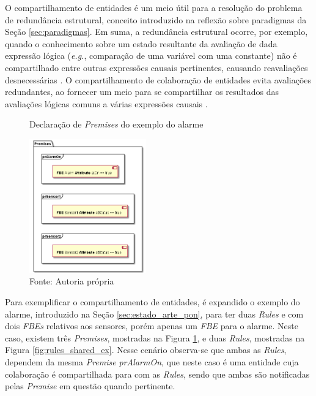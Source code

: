 O compartilhamento de entidades é um meio útil para a resolução do
problema de redundância estrutural, conceito introduzido na reflexão sobre
paradigmas da Seção \ref{sec:paradigmas}. Em suma, a redundância estrutural
ocorre, por exemplo, quando o conhecimento sobre um estado resultante da
avaliação de dada expressão lógica (\textit{e.g.}, comparação de uma variável com uma
constante) não é compartilhado entre outras expressões causais pertinentes,
causando reavaliações desnecessárias \cite{msc_Banaszewski_2009}. O
compartilhamento de colaboração de entidades evita avaliações redundantes, ao fornecer um meio
para se compartilhar os resultados das avaliações lógicas comuns a várias
expressões causais \cite{msc_Banaszewski_2009}.

\begin{figure}[!htb]
  \centering
  \caption{Declaração de \textit{Premises} do exemplo do alarme}
  \includegraphics[width=0.45\textwidth]{../out/diagrams/shared_premises/premises.png}
  \smallskip
  \caption*{Fonte: Autoria própria}
  \label{fig:premises_shared_ex}
\end{figure}

Para exemplificar o compartilhamento de entidades, é expandido o exemplo do
alarme, introduzido na Seção \ref{sec:estado_arte_pon}, para ter duas
\textit{Rules} e com dois \textit{FBEs} relativos aos sensores, porém apenas um
\textit{FBE} para o alarme. Neste caso, existem três \textit{Premises},
mostradas na Figura \ref{fig:premises_shared_ex}, e duas \textit{Rules},
mostradas na Figura \ref{fig:rules_shared_ex}. Nesse cenário observa-se que
ambas as \textit{Rules}, dependem da mesma \textit{Premise} \textit{prAlarmOn},
que neste caso é uma entidade cuja colaboração é compartilhada para com as
\textit{Rules}, sendo que ambas são notificadas pelas \textit{Premise} em
questão quando pertinente.

